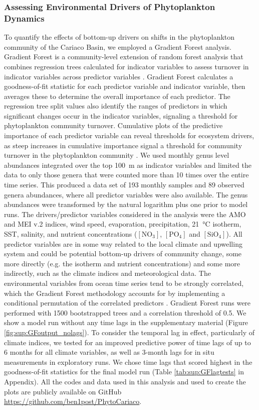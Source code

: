 \documentclass[draft]{agujournal2019}
\begin{document}
        
    \subsubsection{Assessing Environmental Drivers of Phytoplankton Dynamics}
    To quantify the effects of bottom-up drivers on shifts in the phytoplankton community of the Cariaco Basin, we employed a Gradient Forest analysis. Gradient Forest is a community-level extension of random forest analysis that combines regression trees calculated for indicator variables to assess turnover in indicator variables across predictor variables \cite{pitcher_example_2012, large_critical_2015, tam_comparing_2017}. Gradient Forest calculates a goodness-of-fit statistic for each predictor variable and indicator variable, then averages these to determine the overall importance of each predictor. The regression tree split values also identify the ranges of predictors in which significant changes occur in the indicator variables, signaling a threshold for phytoplankton community turnover. Cumulative plots of the predictive importance of each predictor variable can reveal thresholds for ecosystem drivers, as steep increases in cumulative importance signal a threshold for community turnover in the phytoplankton community \cite{tam_comparing_2017}. We used monthly genus level abundances integrated over the top \qty{100}{\meter} as indicator variables and limited the data to only those genera that were counted more than 10 times over the entire time series. This produced a data set of 193 monthly samples and 89 observed genera abundances, where all predictor variables were also available. The genus abundances were transformed by the natural logarithm plus one prior to model runs. The drivers/predictor variables considered in the analysis were the AMO and MEI v.2 indices, wind speed, evaporation, precipitation, \qty{21}{\celsius} isotherm, SST, salinity, and nutrient concentrations ($\mathrm{[NO_3]}$, $\mathrm{[PO_4]}$ and $\mathrm{[SiO_4]}$). All predictor variables are in some way related to the local climate and upwelling system and could be potential bottom-up drivers of community change, some more directly (e.g. the isotherm and nutrient concentrations) and some more indirectly, such as the climate indices and meteorological data. 
    The environmental variables from ocean time series tend to be strongly correlated, which the Gradient Forest methodology accounts for by implementing a conditional permutation of the correlated predictors \cite{ellis_gradient_2012}. Gradient Forest runs were performed with 1500 bootstrapped trees and a correlation threshold of 0.5.
    We show a model run without any time lags in the supplementary material (Figure \ref{fig:sup:GFoutput_nolags}). To consider the temporal lag in effect, particularly of climate indices, we tested for an improved predictive power of time lags of up to 6 months for all climate variables, as well as 3-month lags for in situ measurements in exploratory runs. We chose time lags that scored highest in the goodness-of-fit statistics for the final model run (Table \ref{tab:sup:GFlagtests} in Appendix). All the codes and data used in this analysis and used to create the plots are publicly available on GitHub \url{https://github.com/ben1post/PhytoCariaco}.
\end{document}
